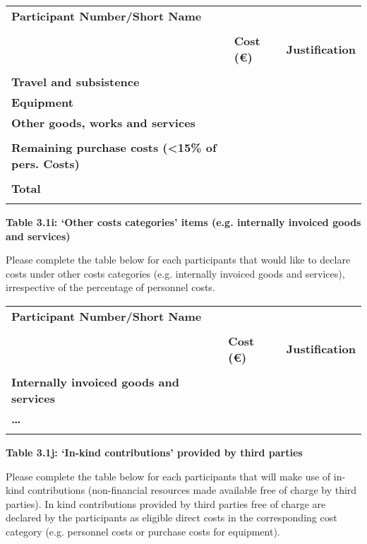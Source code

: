 \begin{longtable}[]{@{}lll@{}}
\toprule
\endhead
\textbf{Participant Number/Short Name} & & \\
& & \\
& \textbf{Cost (€)} & \textbf{Justification} \\
& & \\
\textbf{Travel and subsistence } & & \\
\textbf{Equipment } & & \\
\textbf{Other goods, works and services} & & \\
& & \\
\textbf{Remaining purchase costs (\textless{}15\% of pers. Costs)} &
& \\
& & \\
\textbf{Total} & & \\
& & \\
\bottomrule
\end{longtable}

\textbf{Table 3.1i: `Other costs categories' items (e.g. internally
invoiced goods and services)}

Please complete the table below for each participants that would like to
declare costs under other costs categories (e.g. internally invoiced
goods and services), irrespective of the percentage of personnel costs.

\begin{longtable}[]{@{}lll@{}}
\toprule
\endhead
\textbf{Participant Number/Short Name} & & \\
& & \\
& \textbf{Cost (€)} & \textbf{Justification} \\
& & \\
\textbf{Internally invoiced goods and services} & & \\
\textbf{\ldots{}} & & \\
& & \\
\bottomrule
\end{longtable}

\textbf{Table 3.1j: `In-kind contributions' provided by third parties}

Please complete the table below for each participants that will make use
of in-kind contributions (non-financial resources made available free of
charge by third parties). In kind contributions provided by third
parties free of charge are declared by the participants as eligible
direct costs in the corresponding cost category (e.g. personnel costs or
purchase costs for equipment).


